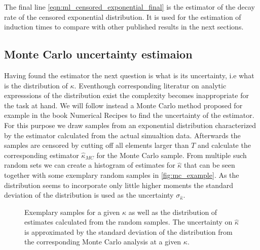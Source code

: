 The final line \autoref{eqn:ml_censored_exponential_final} is the estimator of the decay rate of the censored exponential distribution. It is used for the estimation of induction times to compare with other published results in the next sections.
\subsection{Monte Carlo uncertainty estimaion}
\label{sec:mc_uncertainty}
Having found the estimator the next question is what is its uncertainty, i.e what is the distribution of $\kappa$. Eventhough corresponding literatur on analytic expresssions of the distribution exist the complexity becomes inappropriate for the task at hand. We will follow instead a Monte Carlo method proposed for example in the book Numerical Recipes  to find the uncertainty of the estimator.\\

For this purpose we draw samples from an exponential distribution characterized by the estimator calculated from the actual simualtion data. Afterwards the samples are censored by cutting off all elements larger than $T$ and calculate the corresponding estimator $\hat{\kappa}_{MC}$ for the Monte Carlo sample. From multiple such random sets we can create a histogram of estimates for $\hat{\kappa}$ that can be seen together with some exemplary random samples in \autoref{fig:mc_example}. As the distribution seems to incorporate only little higher moments the standard deviation of the distribution is used as the uncertainty $\sigma_{\hat{\kappa}}$.\\

\begin{figure}[h]
\begin{center}
 \hspace{0.5cm}
\caption{Exemplary samples for a given $\kappa$ as well as the distribution of estimates calculated from the random samples. The uncertainty on $\hat{\kappa}$ is approximated by the standard deviation of the distribution from the corresponding Monte Carlo analysis at a given $\kappa$.}
\label{fig:mc_example}
\end{center}
\end{figure}

